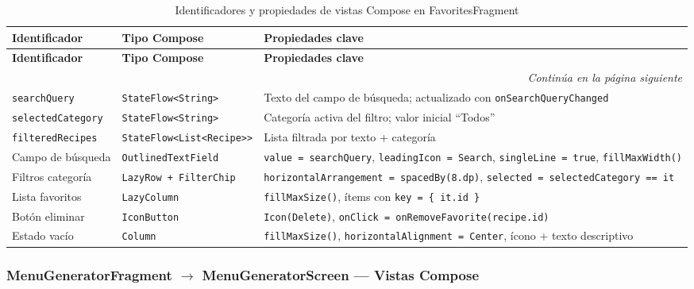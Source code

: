 \documentclass[stu, 12pt, letterpaper, donotrepeattitle, floatsintext, natbib]{apa7}
\begin{document}
\begin{longtable}{@{}p{2.5cm}p{4cm}p{9cm}@{}}
\caption{Identificadores y propiedades de vistas Compose en FavoritesFragment}
\label{tab:idfavorites}\\
\toprule
\textbf{Identificador} & \textbf{Tipo Compose} & \textbf{Propiedades clave} \\
\midrule
\endfirsthead
\toprule
\textbf{Identificador} & \textbf{Tipo Compose} & \textbf{Propiedades clave} \\
\midrule
\endhead
\midrule
\multicolumn{3}{r}{\small\textit{Continúa en la página siguiente}}\\
\endfoot
\bottomrule
\endlastfoot
\texttt{searchQuery} & \texttt{StateFlow<String>} & Texto del campo de búsqueda; actualizado con \texttt{onSearchQueryChanged} \\[3pt]
\texttt{selectedCategory} & \texttt{StateFlow<String>} & Categoría activa del filtro; valor inicial ``Todos'' \\[3pt]
\texttt{filteredRecipes} & \texttt{StateFlow<List<Recipe>{}>} & Lista filtrada por texto + categoría \\[3pt]
Campo de búsqueda & \texttt{OutlinedTextField} & \texttt{value = searchQuery}, \texttt{leadingIcon = Search}, \texttt{singleLine = true}, \texttt{fillMaxWidth()} \\[3pt]
Filtros categoría & \texttt{LazyRow + FilterChip} & \texttt{horizontalArrangement = spacedBy(8.dp)}, \texttt{selected = selectedCategory == it} \\[3pt]
Lista favoritos & \texttt{LazyColumn} & \texttt{fillMaxSize()}, ítems con \texttt{key = \{ it.id \}} \\[3pt]
Botón eliminar & \texttt{IconButton} & \texttt{Icon(Delete)}, \texttt{onClick = onRemoveFavorite(recipe.id)} \\[3pt]
Estado vacío & \texttt{Column} & \texttt{fillMaxSize()}, \texttt{horizontalAlignment = Center}, ícono + texto descriptivo \\
\end{longtable}

\subsubsection{MenuGeneratorFragment $\rightarrow$ MenuGeneratorScreen --- Vistas Compose}
\end{document}
